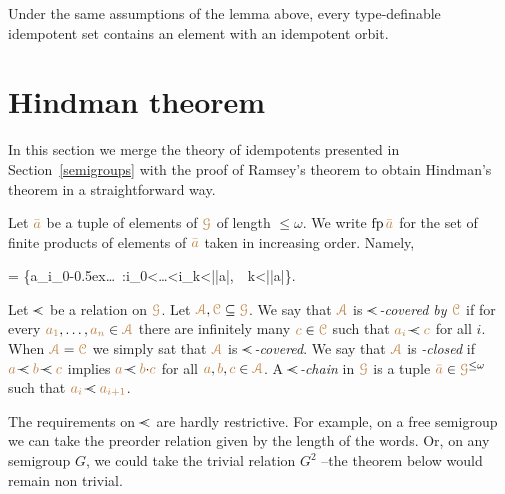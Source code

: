\documentclass[creche.tex]{subfiles}
\begin{document}
\begin{corollary}\label{corol_idempotent}
Under the same assumptions of the lemma above, every type-definable 
idempotent set contains an element with an idempotent orbit.\QED
\end{corollary}

\section{Hindman theorem}\label{Hindman}

In this section we merge the theory of idempotents presented in Section~\ref{semigroups}
with the proof of Ramsey's theorem to obtain Hindman's theorem in a straightforward way.

Let ${\color{brown}\bar a}$ be a tuple of elements of ${\color{brown}\EuScript G}$ of length $\le\omega$.
We write ${\rm fp}\,{\color{brown}\bar a}$ for the set of finite products of elements 
of ${\color{brown}\bar a}$ taken in increasing order. 
Namely, 

{=}
{\Big\{{\mr a_{i_0}}\kern-0.5ex\cdot\dots{}\ :\quad i_0<\dots<i_k<|{\mr\bar a}|,\ \ k<|{\mr\bar a}|\Big\}}. 

% 
% 
\bigskip
Let \emph{$\cpaw$\/} be a relation on ${\color{brown}\EuScript G}$.
Let ${\color{brown}{\EuScript A}},{\color{brown}\EuScript C}\subseteq{\color{brown}\EuScript G}$.
We say that ${\color{brown}{\EuScript A}}$ is \emph{$\cpaw$-covered by ${\color{brown}\EuScript C}$\/} 
if for every ${\color{brown} a_1},\dots,{\color{brown} a_n}\in{\color{brown}{\EuScript A}}$ there are infinitely many ${\color{brown} c}\in{\color{brown}\EuScript C}$ such that ${\mr a_i}\cpaw{\mr c}$ for all $i$.
When ${\color{brown}{\EuScript A}}={\color{brown}\EuScript C}$ we simply sat that ${\color{brown}{\EuScript A}}$ is \emph{$\cpaw$-covered}.
We say that ${\color{brown}{\EuScript A}}$ is \emph{\cpawdot-closed\/} 
if ${\mr a}\cpaw{\mr b}\cpaw{\mr c}$ implies ${\mr a}\cpaw{\mr b}{\cdot}{\mr c}$ 
for all ${\color{brown} a},{\color{brown} b},{\color{brown} c}\in{\color{brown}{\EuScript A}}$.
A \emph{$\cpaw$-chain\/} in ${\color{brown}\EuScript G}$ is a tuple ${\color{brown}\bar a}\in{\color{brown}\EuScript G}^{\le\omega}$ such that ${\mr a_i}\cpaw{\mr a_{i+1}}$.

The requirements on  $\cpaw$ are hardly restrictive.
For example, on a free semigroup we can take the preorder relation given by the length of the words.
%
Or, on any semigroup $G$, we could take the trivial relation $G^2$ --the theorem below would remain non trivial.
\end{document}
